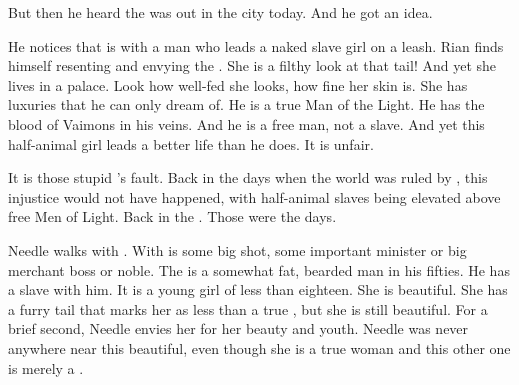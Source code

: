 But then he heard the \rinyuth was out in the city today. 
And he got an idea. 

  
He notices that \Tiroco is with a man who leads a naked \sheomir slave girl on a leash.
Rian finds himself resenting and envying the \sheomir. 
She is a filthy \demihuman\dash look at that tail!
And yet she lives in a palace. 
Look how well-fed she looks, how fine her skin is. 
She has luxuries that he can only dream of. 
He is a true Man of the Light.
He has the blood of Vaimons in his veins.
And he is a free man, not a slave.
And yet this half-animal girl leads a better life than he does. 
It is unfair. 

It is those stupid \scathae's fault. 
Back in the days when the world was ruled by \humans, this injustice would not have happened, with half-animal slaves being elevated above free Men of Light. 
Back in the \VaimonCaliphate. 
Those were the days. 






\begin{comment}
  \section{Needle}
\end{comment}
\new 
Needle walks with \Tiroco. 
With \Tiroco is some \human big shot, some important minister or big merchant boss or noble. 
The \human is a somewhat fat, bearded man in his fifties.
He has a slave with him. 
It is a young \sheomir girl of less than eighteen. 
She is beautiful. 
She has a furry tail that marks her as less than a true \human, but she is still beautiful. 
For a brief second, Needle envies her for her beauty and youth.
Needle was never anywhere near this beautiful, even though she is a true woman and this other one is merely a \demihuman. 

